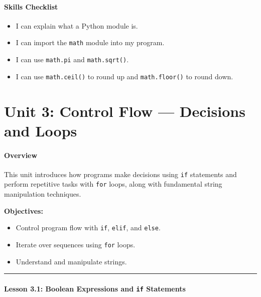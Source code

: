 \documentclass[
  justified,
  openright,
]{tufte-book}
\let\subsection\paragraph
\let\paragraph\paragraph
\let\subsection\paragraph
\let\paragraph\paragraph
\providecommand{\tightlist}{%
  \setlength{\itemsep}{0pt}\setlength{\parskip}{0pt}}
\begin{document}
\subsection{Skills Checklist}\label{skills-checklist-11}

\begin{itemize}
\tightlist
\item[$\square$]
  I can explain what a Python module is.
\item[$\square$]
  I can import the \texttt{math} module into my program.
\item[$\square$]
  I can use \texttt{math.pi} and \texttt{math.sqrt()}.
\item[$\square$]
  I can use \texttt{math.ceil()} to round up and \texttt{math.floor()}
  to round down.
\end{itemize}

\newpage

\section{Unit 3: Control Flow --- Decisions and
Loops}\label{unit-3-control-flow-decisions-and-loops-1}

\subsection{Overview}\label{overview-3}

This unit introduces how programs make decisions using \texttt{if}
statements and perform repetitive tasks with \texttt{for} loops, along
with fundamental string manipulation techniques.

\textbf{Objectives:}

\begin{itemize}
\tightlist
\item
  Control program flow with \texttt{if}, \texttt{elif}, and
  \texttt{else}.
\item
  Iterate over sequences using \texttt{for} loops.
\item
  Understand and manipulate strings.
\end{itemize}

\begin{center}\rule{0.5\linewidth}{0.5pt}\end{center}

\subsection{\texorpdfstring{Lesson 3.1: Boolean Expressions and
\texttt{if}
Statements}{Lesson 3.1: Boolean Expressions and if Statements}}\label{lesson-3.1-boolean-expressions-and-if-statements}
\end{document}

